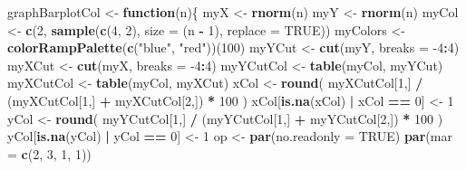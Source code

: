 \documentclass[]{book}
\newenvironment{Shaded}{\begin{snugshade}}{\end{snugshade}}
\newcommand{\ControlFlowTok}[1]{\textcolor[rgb]{0.13,0.29,0.53}{\textbf{#1}}}
\newcommand{\DataTypeTok}[1]{\textcolor[rgb]{0.13,0.29,0.53}{#1}}
\newcommand{\DecValTok}[1]{\textcolor[rgb]{0.00,0.00,0.81}{#1}}
\newcommand{\KeywordTok}[1]{\textcolor[rgb]{0.13,0.29,0.53}{\textbf{#1}}}
\newcommand{\NormalTok}[1]{#1}
\newcommand{\OperatorTok}[1]{\textcolor[rgb]{0.81,0.36,0.00}{\textbf{#1}}}
\newcommand{\OtherTok}[1]{\textcolor[rgb]{0.56,0.35,0.01}{#1}}
\newcommand{\StringTok}[1]{\textcolor[rgb]{0.31,0.60,0.02}{#1}}
\begin{document}
\begin{Shaded}
\begin{Highlighting}[]
\NormalTok{graphBarplotCol <-}\StringTok{ }\ControlFlowTok{function}\NormalTok{(n)\{}
\NormalTok{  myX <-}\StringTok{ }\KeywordTok{rnorm}\NormalTok{(n)}
\NormalTok{  myY <-}\StringTok{ }\KeywordTok{rnorm}\NormalTok{(n)}
\NormalTok{  myCol <-}\StringTok{ }\KeywordTok{c}\NormalTok{(}\DecValTok{2}\NormalTok{, }\KeywordTok{sample}\NormalTok{(}\KeywordTok{c}\NormalTok{(}\DecValTok{4}\NormalTok{, }\DecValTok{2}\NormalTok{), }\DataTypeTok{size =}\NormalTok{ (n }\OperatorTok{-}\StringTok{ }\DecValTok{1}\NormalTok{), }\DataTypeTok{replace =} \OtherTok{TRUE}\NormalTok{))}
\NormalTok{  myColors <-}\StringTok{ }\KeywordTok{colorRampPalette}\NormalTok{(}\KeywordTok{c}\NormalTok{(}\StringTok{"blue"}\NormalTok{, }\StringTok{"red"}\NormalTok{))(}\DecValTok{100}\NormalTok{)}
\NormalTok{  myYCut <-}\StringTok{ }\KeywordTok{cut}\NormalTok{(myY, }\DataTypeTok{breaks =} \DecValTok{-4}\OperatorTok{:}\DecValTok{4}\NormalTok{)}
\NormalTok{  myXCut <-}\StringTok{ }\KeywordTok{cut}\NormalTok{(myX, }\DataTypeTok{breaks =} \DecValTok{-4}\OperatorTok{:}\DecValTok{4}\NormalTok{)}
\NormalTok{  myYCutCol <-}\StringTok{ }\KeywordTok{table}\NormalTok{(myCol, myYCut)}
\NormalTok{  myXCutCol <-}\StringTok{ }\KeywordTok{table}\NormalTok{(myCol, myXCut)}
\NormalTok{  xCol <-}\StringTok{ }\KeywordTok{round}\NormalTok{(}
\NormalTok{    myXCutCol[}\DecValTok{1}\NormalTok{,] }\OperatorTok{/}\StringTok{ }\NormalTok{(myXCutCol[}\DecValTok{1}\NormalTok{,] }\OperatorTok{+}\StringTok{ }\NormalTok{myXCutCol[}\DecValTok{2}\NormalTok{,]) }\OperatorTok{*}\StringTok{ }\DecValTok{100}
\NormalTok{  )}
\NormalTok{  xCol[}\KeywordTok{is.na}\NormalTok{(xCol) }\OperatorTok{|}\StringTok{ }\NormalTok{xCol }\OperatorTok{==}\StringTok{ }\DecValTok{0}\NormalTok{] <-}\StringTok{ }\DecValTok{1}
\NormalTok{  yCol <-}\StringTok{ }\KeywordTok{round}\NormalTok{(}
\NormalTok{    myYCutCol[}\DecValTok{1}\NormalTok{,] }\OperatorTok{/}\StringTok{ }\NormalTok{(myYCutCol[}\DecValTok{1}\NormalTok{,] }\OperatorTok{+}\StringTok{ }\NormalTok{myYCutCol[}\DecValTok{2}\NormalTok{,]) }\OperatorTok{*}\StringTok{ }\DecValTok{100}
\NormalTok{  )}
\NormalTok{  yCol[}\KeywordTok{is.na}\NormalTok{(yCol) }\OperatorTok{|}\StringTok{ }\NormalTok{yCol }\OperatorTok{==}\StringTok{ }\DecValTok{0}\NormalTok{] <-}\StringTok{ }\DecValTok{1}
\NormalTok{  op <-}\StringTok{ }\KeywordTok{par}\NormalTok{(}\DataTypeTok{no.readonly =} \OtherTok{TRUE}\NormalTok{)}
  \KeywordTok{par}\NormalTok{(}\DataTypeTok{mar =} \KeywordTok{c}\NormalTok{(}\DecValTok{2}\NormalTok{, }\DecValTok{3}\NormalTok{, }\DecValTok{1}\NormalTok{, }\DecValTok{1}\NormalTok{))}

\end{Highlighting}
\end{Shaded}
\end{document}
